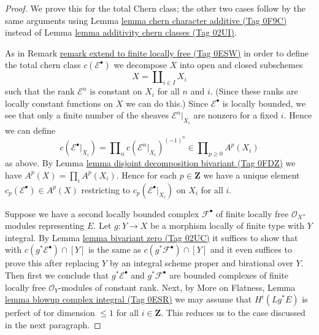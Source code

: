 \documentclass{amsart}
\theoremstyle{plain}
\theoremstyle{definition}
\theoremstyle{remark}
\numberwithin{equation}{subsection}
\begin{document}
\begin{proof}
We prove this for the total Chern class; the other two cases follow
by the same arguments using
Lemma \href{https://stacks.math.columbia.edu/tag/0F9C}{lemma chern character additive (Tag 0F9C)}
instead of
Lemma \href{https://stacks.math.columbia.edu/tag/02UI}{lemma additivity chern classes (Tag 02UI)}.

\medskip\noindent
As in Remark \href{https://stacks.math.columbia.edu/tag/0ESW}{remark extend to finite locally free (Tag 0ESW)} in order
to define the total chern class $c(\mathcal{E}^\bullet)$
we decompose $X$ into open and closed subschemes
$$
X = \coprod\nolimits_{i \in I} X_i
$$
such that the rank $\mathcal{E}^n$ is constant on $X_i$ for
all $n$ and $i$. (Since these ranks are locally constant functions
on $X$ we can do this.) Since $\mathcal{E}^\bullet$ is locally
bounded, we see that only a finite number of the sheaves
$\mathcal{E}^n|_{X_i}$ are nonzero for a fixed $i$. Hence we
can define
$$
c(\mathcal{E}^\bullet|_{X_i}) =
\prod\nolimits_n c(\mathcal{E}^n|_{X_i})^{(-1)^n}
\in \prod\nolimits_{p \geq 0} A^p(X_i)
$$
as above. By Lemma \href{https://stacks.math.columbia.edu/tag/0FDZ}{lemma disjoint decomposition bivariant (Tag 0FDZ)}
we have $A^p(X) = \prod_i A^p(X_i)$. Hence for each $p \in \mathbf{Z}$
we have a unique element $c_p(\mathcal{E}^\bullet) \in A^p(X)$ restricting
to $c_p(\mathcal{E}^\bullet|_{X_i})$ on $X_i$ for all $i$.

\medskip\noindent
Suppose we have a second locally bounded complex
$\mathcal{F}^\bullet$ of finite locally free $\mathcal{O}_X$-modules
representing $E$.
Let $g : Y \to X$ be a morphism locally of finite type with $Y$ integral.
By Lemma \href{https://stacks.math.columbia.edu/tag/02UC}{lemma bivariant zero (Tag 02UC)} it suffices to show that
with $c(g^*\mathcal{E}^\bullet) \cap [Y]$ is the same as
$c(g^*\mathcal{F}^\bullet) \cap [Y]$ and it even suffices to prove
this after replacing $Y$ by an integral scheme proper and birational
over $Y$. Then first we conclude that $g^*\mathcal{E}^\bullet$
and $g^*\mathcal{F}^\bullet$ are bounded complexes of finite locally
free $\mathcal{O}_Y$-modules of constant rank. Next, by
More on Flatness, Lemma \href{https://stacks.math.columbia.edu/tag/0ESR}{lemma blowup complex integral (Tag 0ESR)}
we may assume that $H^i(Lg^*E)$ is perfect of tor dimension $\leq 1$
for all $i \in \mathbf{Z}$.
This reduces us to the case discussed in the next paragraph.


\end{proof}
\end{document}
